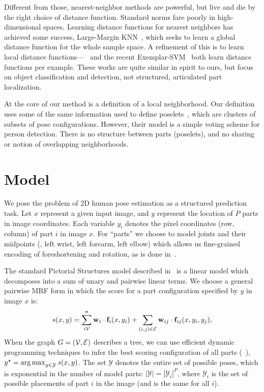 Different from those, nearest-neighbor methods are powerful, but live and die 
by the right choice of distance function.  Standard norms fare poorly in 
high-dimensional spaces.  Learning distance functions for nearest neighbors has 
achieved some success, \eg Large-Margin KNN~\citep{lmknn}, which seeks to learn 
a global distance function for the whole sample space.  A refinement of this is 
to learn local distance functions---~\citep{frome07} and the recent 
Exemplar-SVM~\citep{esvm} both learn distance functions per example.  These 
works are quite similar in spirit to ours, but focus on object classification 
and detection, not structured, articulated part localization.

At the core of our method is a definition of a local neighborhood.  Our 
definition uses some of the same information used to define 
poselets~\citep{bourdev09}, which are clusters of subsets of pose 
configurations.  However, their model is a simple voting scheme for person 
detection.  There is no structure between parts (poselets), and no sharing or 
notion of overlapping neighborhoods.



\section{Model}\label{sec:llps-model}

We pose the problem of 2D human pose estimation as a structured prediction 
task.  Let $x$ represent a given input image, and $y$ represent the location of 
$P$ parts in image coordinates.  Each variable $y_i$ denotes the pixel 
coordinates (row, column) of part $i$ in image $x$.  For ``parts'' we choose to 
model joints and their midpoints (\eg, left wrist, left forearm, left elbow) 
which allows us fine-grained encoding of foreshortening and rotation, as is 
done in~\citep{deva2011,sapp2011}.

The standard Pictorial Structures model described in~ is a linear 
model which decomposes into a sum of unary and pairwise linear terms.  We 
choose a general pairwise MRF form in which the score for a part configuration 
specified by $y$ in image $x$ is:
\begin{align}
 s(x,y) = \sum_{i \mathcal{V}}^n \mathbf{w}_i \cdot \mathbf{f}_i(x,y_i) + \sum_{(i,j) \in \mathcal{E}} \mathbf{w}_{ij} 
\cdot \mathbf{f}_{ij}(x,y_i,y_j),
 \label{eq:llps-ps}
\end{align}
When the graph $G = (\mathcal{V},\mathcal{E})$ describes a tree, we can use efficient dynamic 
programming techniques to infer the best scoring configuration of all parts 
(~), $y^\star = \mathop{\arg\max}_{y \in \mathcal{Y}} s(x,y)$.
The set $\mathcal{Y}$ denotes the entire set of possible poses, which is 
exponential in the number of model parts: $|\mathcal{Y}| = |\mathcal{Y}_i|^P$, 
where $\mathcal{Y}_i$ is the set of possible placements of part $i$ in the 
image (and is the same for all $i$).

